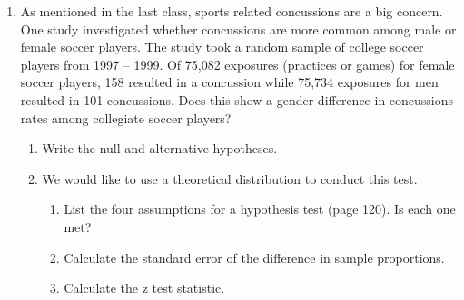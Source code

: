 \begin{enumerate}
\begin{enumerate}
         \end{enumerate}
       \item As mentioned in the last class, sports related
         concussions are a big concern.    One study
         investigated whether concussions are more common among male
         or female soccer players.  The study took a random sample of
         college soccer players from 1997 – 1999.  Of 75,082 exposures
         (practices or games) for female soccer players, 158 resulted
         in a concussion while 75,734 exposures for men resulted in
         101 concussions.  Does this show a gender difference in
         concussions rates among collegiate soccer players?  
         \begin{enumerate}
         \item  Write the null and alternative hypotheses. 
\begin{students}
          \vspace{2cm}
\end{students}
\begin{key}
 {\it  }      
\end{key}

         \item  We would like to use a theoretical distribution to
           conduct this  test. 
          \begin{enumerate}
           \item List the four assumptions for a hypothesis test (page
             120).  Is  each one met?  
\begin{students}
          \vspace{3cm}
\end{students}
\begin{key}
 {\it  }      
\end{key}
           \item  Calculate the standard error of the difference in
             sample proportions. 
\begin{students}
          \vspace{1cm}
\end{students}
\begin{key}
 {\it  }      
\end{key}
           \item  Calculate the z test statistic.
\begin{students}
          \vspace{1.52cm}
\end{students}
\begin{key}
 {\it  }      
\end{key}


\end{enumerate}
\end{enumerate}
\end{enumerate}
